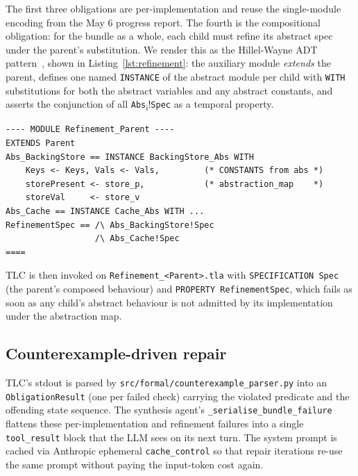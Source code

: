\documentclass[11pt]{article}
\begin{document}
The first three obligations are per-implementation and reuse the
single-module encoding from the May 6 progress report. The fourth is the
compositional obligation: for the bundle as a whole, each child must refine
its abstract spec under the parent's substitution. We render this as the
Hillel-Wayne ADT pattern~\cite{hillelwayne-tla-adt}, shown in
Listing~\ref{lst:refinement}: the auxiliary module \emph{extends} the parent,
defines one named \texttt{INSTANCE} of the abstract module per child with
\texttt{WITH} substitutions for both the abstract variables and any abstract
constants, and asserts the conjunction of all \texttt{Abs}\textsubscript{i}!\texttt{Spec}
as a temporal property.

\begin{lstlisting}[caption={Generated \texttt{Refinement\_Parent.tla}
(simplified). The \texttt{const\_clauses} and \texttt{var\_clauses} come from
the abstract module's \texttt{CONSTANTS} declaration and the
implementation's \texttt{abstraction\_map}, respectively.},
label=lst:refinement,float=t]
---- MODULE Refinement_Parent ----
EXTENDS Parent
Abs_BackingStore == INSTANCE BackingStore_Abs WITH
    Keys <- Keys, Vals <- Vals,         (* CONSTANTS from abs *)
    storePresent <- store_p,            (* abstraction_map    *)
    storeVal     <- store_v
Abs_Cache == INSTANCE Cache_Abs WITH ...
RefinementSpec == /\ Abs_BackingStore!Spec
                  /\ Abs_Cache!Spec
====
\end{lstlisting}

TLC is then invoked on \texttt{Refinement\_<Parent>.tla} with
\texttt{SPECIFICATION Spec} (the parent's composed behaviour) and
\texttt{PROPERTY RefinementSpec}, which fails as soon as any child's
abstract behaviour is not admitted by its implementation under the
abstraction map.

\subsection{Counterexample-driven repair}
TLC's stdout is parsed by \texttt{src/formal/counterexample\_parser.py}
into an \texttt{ObligationResult} (one per failed check) carrying the
violated predicate and the offending state sequence. The synthesis agent's
\texttt{\_serialise\_bundle\_failure} flattens these per-implementation and
refinement failures into a single \texttt{tool\_result} block that the LLM
sees on its next turn. The system prompt is cached via Anthropic
ephemeral \texttt{cache\_control} so that repair iterations re-use the same
prompt without paying the input-token cost again.
\end{document}
